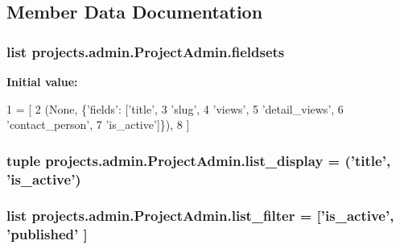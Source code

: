 \subsection{Member Data Documentation}
\hypertarget{classprojects_1_1admin_1_1_project_admin_a1fdb2514f49cffed93941b51fa1cd445}{
\subsubsection[{fieldsets}]{\setlength{\rightskip}{0pt plus 5cm}list projects.\-admin.\-Project\-Admin.\-fieldsets\hspace{0.3cm}{\ttfamily [static]}}}\label{classprojects_1_1admin_1_1_project_admin_a1fdb2514f49cffed93941b51fa1cd445}
{\bfseries Initial value\-:}
\begin{DoxyCode}
1 = [
2         (\textcolor{keywordtype}{None}, \{\textcolor{stringliteral}{'fields'}: [\textcolor{stringliteral}{'title'},
3                            \textcolor{stringliteral}{'slug'},
4                            \textcolor{stringliteral}{'views'},
5                            \textcolor{stringliteral}{'detail\_views'},
6                            \textcolor{stringliteral}{'contact\_person'},
7                            \textcolor{stringliteral}{'is\_active'}]\}),
8     ]
\end{DoxyCode}
\hypertarget{classprojects_1_1admin_1_1_project_admin_ad089d0d056748a3ec8878f92fa050b0d}{
\subsubsection[{list\-\_\-display}]{\setlength{\rightskip}{0pt plus 5cm}tuple projects.\-admin.\-Project\-Admin.\-list\-\_\-display = ('title', 'is\-\_\-active')\hspace{0.3cm}{\ttfamily [static]}}}\label{classprojects_1_1admin_1_1_project_admin_ad089d0d056748a3ec8878f92fa050b0d}
\hypertarget{classprojects_1_1admin_1_1_project_admin_a7a0b71d041c73c01049e69b68d3f1ab0}{
\subsubsection[{list\-\_\-filter}]{\setlength{\rightskip}{0pt plus 5cm}list projects.\-admin.\-Project\-Admin.\-list\-\_\-filter = \mbox{[}'is\-\_\-active', 'published' \mbox{]}\hspace{0.3cm}{\ttfamily [static]}}}\label{classprojects_1_1admin_1_1_project_admin_a7a0b71d041c73c01049e69b68d3f1ab0}
